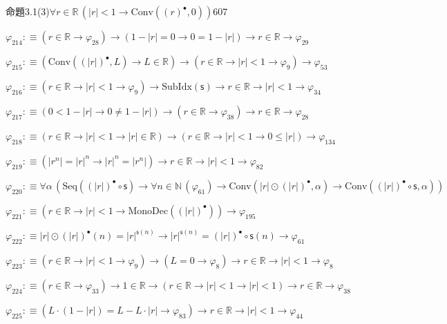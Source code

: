 \begin{fullproof}{命題3.1(3)}{$\forall r \in \mathbb{R}\,(\lvert r \rvert < 1 \to \mathrm{Conv}({(r)^{\bullet}},0))$}{607}
\begin{abbrevlist}
\item $\varphi_{214} :\equiv (r \in \mathbb{R} \to \varphi_{28}) \to (1 - \lvert r \rvert = 0 \to 0 = 1 - \lvert r \rvert) \to r \in \mathbb{R} \to \varphi_{29}$
\item $\varphi_{215} :\equiv (\mathrm{Conv}({(\lvert r \rvert)^{\bullet}},L) \to L \in \mathbb{R}) \to (r \in \mathbb{R} \to \lvert r \rvert < 1 \to \varphi_{9}) \to \varphi_{53}$
\item $\varphi_{216} :\equiv (r \in \mathbb{R} \to \lvert r \rvert < 1 \to \varphi_{9}) \to \mathrm{SubIdx}(\mathsf{s}) \to r \in \mathbb{R} \to \lvert r \rvert < 1 \to \varphi_{34}$
\item $\varphi_{217} :\equiv (0 < 1 - \lvert r \rvert \to 0 \neq 1 - \lvert r \rvert) \to (r \in \mathbb{R} \to \varphi_{38}) \to r \in \mathbb{R} \to \varphi_{28}$
\item $\varphi_{218} :\equiv (r \in \mathbb{R} \to \lvert r \rvert < 1 \to \lvert r \rvert \in \mathbb{R}) \to (r \in \mathbb{R} \to \lvert r \rvert < 1 \to 0 \leq \lvert r \rvert) \to \varphi_{134}$
\item $\varphi_{219} :\equiv (\lvert {{r}^{n}} \rvert = {{\lvert r \rvert}^{n}} \to {{\lvert r \rvert}^{n}} = \lvert {{r}^{n}} \rvert) \to r \in \mathbb{R} \to \lvert r \rvert < 1 \to \varphi_{82}$
\item $\varphi_{220} :\equiv \forall \alpha\,(\mathrm{Seq}({(\lvert r \rvert)^{\bullet}} \circ \mathsf{s}) \to \forall n \in \mathbb{N}\,(\varphi_{61}) \to \mathrm{Conv}(\lvert r \rvert \odot {(\lvert r \rvert)^{\bullet}},\alpha) \to \mathrm{Conv}({(\lvert r \rvert)^{\bullet}} \circ \mathsf{s},\alpha))$
\item $\varphi_{221} :\equiv (r \in \mathbb{R} \to \lvert r \rvert < 1 \to \mathrm{MonoDec}({(\lvert r \rvert)^{\bullet}})) \to \varphi_{195}$
\item $\varphi_{222} :\equiv \lvert r \rvert \odot {(\lvert r \rvert)^{\bullet}}(n) = {{\lvert r \rvert}^{\mathsf{s}(n)}} \to {{\lvert r \rvert}^{\mathsf{s}(n)}} = {(\lvert r \rvert)^{\bullet}} \circ \mathsf{s}(n) \to \varphi_{61}$
\item $\varphi_{223} :\equiv (r \in \mathbb{R} \to \lvert r \rvert < 1 \to \varphi_{9}) \to (L = 0 \to \varphi_{8}) \to r \in \mathbb{R} \to \lvert r \rvert < 1 \to \varphi_{8}$
\item $\varphi_{224} :\equiv (r \in \mathbb{R} \to \varphi_{33}) \to 1 \in \mathbb{R} \to (r \in \mathbb{R} \to \lvert r \rvert < 1 \to \lvert r \rvert < 1) \to r \in \mathbb{R} \to \varphi_{38}$
\item $\varphi_{225} :\equiv (L \cdot (1 - \lvert r \rvert) = L - L \cdot \lvert r \rvert \to \varphi_{83}) \to r \in \mathbb{R} \to \lvert r \rvert < 1 \to \varphi_{44}$

\end{abbrevlist}
\end{fullproof}
